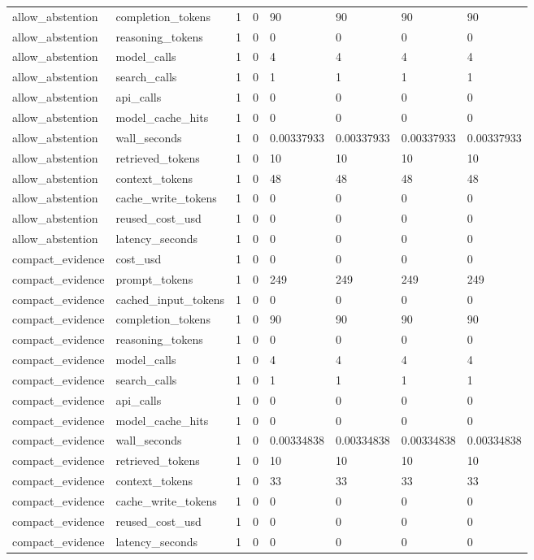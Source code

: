 \begin{tabular}{llllllll}
allow\_abstention & completion\_tokens & 1 & 0 & 90 & 90 & 90 & 90 \\
allow\_abstention & reasoning\_tokens & 1 & 0 & 0 & 0 & 0 & 0 \\
allow\_abstention & model\_calls & 1 & 0 & 4 & 4 & 4 & 4 \\
allow\_abstention & search\_calls & 1 & 0 & 1 & 1 & 1 & 1 \\
allow\_abstention & api\_calls & 1 & 0 & 0 & 0 & 0 & 0 \\
allow\_abstention & model\_cache\_hits & 1 & 0 & 0 & 0 & 0 & 0 \\
allow\_abstention & wall\_seconds & 1 & 0 & 0.00337933 & 0.00337933 & 0.00337933 & 0.00337933 \\
allow\_abstention & retrieved\_tokens & 1 & 0 & 10 & 10 & 10 & 10 \\
allow\_abstention & context\_tokens & 1 & 0 & 48 & 48 & 48 & 48 \\
allow\_abstention & cache\_write\_tokens & 1 & 0 & 0 & 0 & 0 & 0 \\
allow\_abstention & reused\_cost\_usd & 1 & 0 & 0 & 0 & 0 & 0 \\
allow\_abstention & latency\_seconds & 1 & 0 & 0 & 0 & 0 & 0 \\
compact\_evidence & cost\_usd & 1 & 0 & 0 & 0 & 0 & 0 \\
compact\_evidence & prompt\_tokens & 1 & 0 & 249 & 249 & 249 & 249 \\
compact\_evidence & cached\_input\_tokens & 1 & 0 & 0 & 0 & 0 & 0 \\
compact\_evidence & completion\_tokens & 1 & 0 & 90 & 90 & 90 & 90 \\
compact\_evidence & reasoning\_tokens & 1 & 0 & 0 & 0 & 0 & 0 \\
compact\_evidence & model\_calls & 1 & 0 & 4 & 4 & 4 & 4 \\
compact\_evidence & search\_calls & 1 & 0 & 1 & 1 & 1 & 1 \\
compact\_evidence & api\_calls & 1 & 0 & 0 & 0 & 0 & 0 \\
compact\_evidence & model\_cache\_hits & 1 & 0 & 0 & 0 & 0 & 0 \\
compact\_evidence & wall\_seconds & 1 & 0 & 0.00334838 & 0.00334838 & 0.00334838 & 0.00334838 \\
compact\_evidence & retrieved\_tokens & 1 & 0 & 10 & 10 & 10 & 10 \\
compact\_evidence & context\_tokens & 1 & 0 & 33 & 33 & 33 & 33 \\
compact\_evidence & cache\_write\_tokens & 1 & 0 & 0 & 0 & 0 & 0 \\
compact\_evidence & reused\_cost\_usd & 1 & 0 & 0 & 0 & 0 & 0 \\
compact\_evidence & latency\_seconds & 1 & 0 & 0 & 0 & 0 & 0 \\
\hline
\end{tabular}
